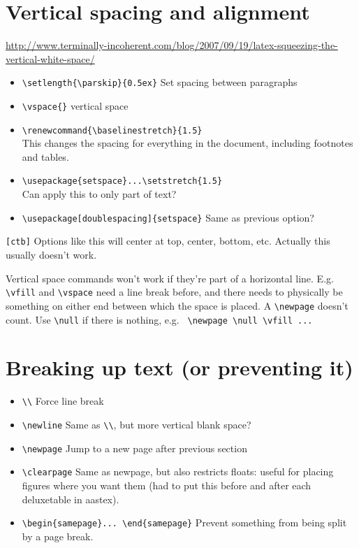 \documentclass{article}
\begin{document}
\section{Vertical spacing and alignment}
\url{http://www.terminally-incoherent.com/blog/2007/09/19/latex-squeezing-the-vertical-white-space/}
\begin{itemize}
    \item \verb|\setlength{\parskip}{0.5ex}| Set spacing between paragraphs
    \item \verb|\vspace{}| vertical space
    \item \verb|\renewcommand{\baselinestretch}{1.5}|\\
        This changes the spacing for everything in the document,
        including footnotes and tables.
    \item \verb|\usepackage{setspace}...\setstretch{1.5}|\\
        Can apply this to only part of text?
    \item \verb|\usepackage[doublespacing]{setspace}|
        Same as previous option?
\end{itemize}
\verb|[ctb]| Options like this will center at top, center, bottom, etc.
Actually this usually doesn't work.

Vertical space commands won't work if they're part of a horizontal line.
E.g. \verb|\vfill| and \verb|\vspace| need a line break before, and there needs
to physically be something on either end between which the space is placed.
A \verb|\newpage| doesn't count. Use \verb|\null| if there is nothing, e.g.
\verb| \newpage \null \vfill ... |

\section{Breaking up text (or preventing it)}
\begin{itemize}
    \item \verb|\\| Force line break
    \item \verb|\newline| Same as \verb|\\|, but more vertical blank space?
    \item \verb|\newpage| Jump to a new page after previous section
    \item \verb|\clearpage| Same as newpage, but also restricts floats: useful
        for placing figures where you want them (had to put this before and after
        each deluxetable in aastex).
    \item \verb|\begin{samepage}... \end{samepage}| Prevent something from
        being split by a page break.
\end{itemize}
\end{document}
